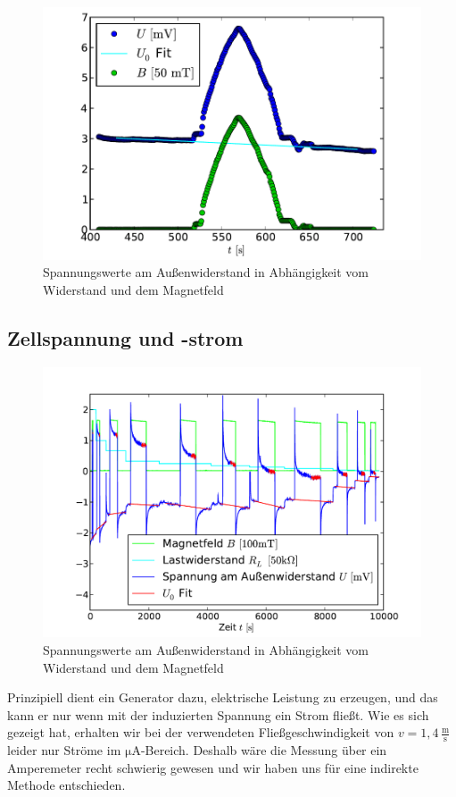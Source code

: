 \documentclass[11pt]{scrartcl}
\newcommand{\unit}[1]{\ensuremath{\,\mathrm{#1}}} %
\begin{document}
\begin{figure}[ht]
\begin{center}
\includegraphics[width=1.0\textwidth]{images/messkurve_spannung.pdf}
\end{center}
\vspace{-1.5\baselineskip}
\caption{Spannungswerte am Außenwiderstand in Abhängigkeit vom Widerstand und dem Magnetfeld}
\label{messkurve_spannung}
\end{figure}


\subsection{Zellspannung und -strom}		%
\begin{figure}[ht]
\begin{center}
\includegraphics[width=1.0\textwidth]{images/rohdaten_strom.pdf}
\end{center}
\vspace{-1.5\baselineskip}
\caption{Spannungswerte am Außenwiderstand in Abhängigkeit vom Widerstand und dem Magnetfeld}
\label{rohdatenstrom}
\end{figure}
Prinzipiell dient ein Generator dazu, elektrische Leistung zu erzeugen, und das kann er nur wenn mit der induzierten Spannung ein Strom fließt.
Wie es sich gezeigt hat, erhalten wir bei der verwendeten Fließgeschwindigkeit von $v=1,4\unit{\frac{m}{s}}$ leider nur Ströme im $\mathrm{\mu A}$-Bereich.
Deshalb wäre die Messung über ein Amperemeter recht schwierig gewesen und wir haben uns für eine indirekte Methode entschieden.
\end{document}
